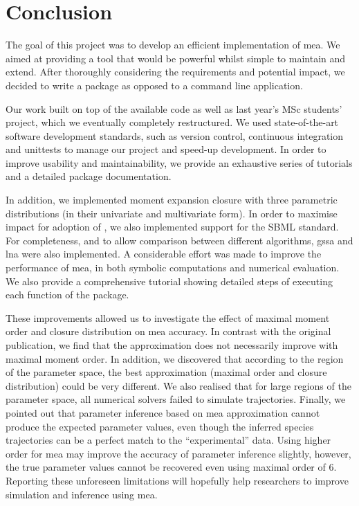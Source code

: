 \section{Conclusion} \label{sec:conclus}

The goal of this project was to develop an efficient \py{} implementation of \acrlong{mea}.
We aimed at providing a tool that would be powerful whilst simple to maintain and extend.
After thoroughly considering the requirements and potential impact, we decided to write a \py{} package as opposed to a command line application.

Our work built on top of the available \mat{} code as well as last year's MSc students' project, which we eventually completely restructured.
We used state-of-the-art software development standards, such as version control, continuous integration and unittests to manage our project and speed-up development.
In order to improve usability and maintainability, we provide an exhaustive series of tutorials and a detailed package documentation.

In addition, we implemented moment expansion closure with three parametric distributions (in their univariate and multivariate form).
In order to maximise impact for adoption of \means, we also implemented support for the SBML standard.
For completeness, and to allow comparison between different algorithms, \gls{gssa} and \gls{lna} were also implemented.
A considerable effort was made to improve the performance of \gls{mea},  in both symbolic computations and numerical evaluation.
We also provide a comprehensive tutorial showing detailed steps of executing each function of the package.

These improvements allowed us to investigate the effect of maximal moment order and closure distribution on \gls{mea} accuracy.
In contrast with the original publication, we find that the approximation does not necessarily improve with maximal moment order.
In addition, we discovered that according to the region of the parameter space, the best approximation (maximal order and closure distribution) could be very different.
We also realised that for large regions of the parameter space, all numerical solvers failed to simulate trajectories.
Finally, we pointed out that parameter inference based on \gls{mea} approximation cannot produce the expected parameter values, even though the inferred species trajectories can be a perfect match to the ``experimental'' data. Using higher order for \gls{mea} may improve the accuracy of parameter inference slightly, however, the true parameter values cannot be recovered even using maximal order of 6.
Reporting these unforeseen limitations will hopefully help researchers to improve simulation and inference using \gls{mea}.

